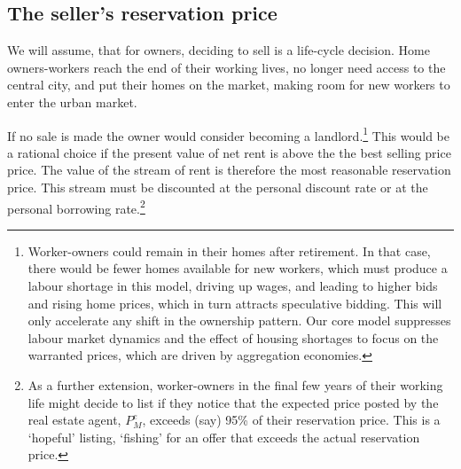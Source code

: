 


\subsection{The seller's reservation price} \label{section-reservation-price}

We will assume,  that for owners, deciding to sell is a life-cycle decision. Home owners-workers  reach the end of their working lives, no longer need access to the central city, and put their homes on the market, making room for new workers to enter the urban market.%


If no sale is made the owner would consider becoming a landlord.\footnote{Worker-owners could remain in their homes after retirement. In that case,  there would be fewer homes available for new workers, which must produce a labour shortage in this model, driving up wages, and leading to higher bids and rising home prices, which in turn attracts  speculative bidding. This will only accelerate any shift in the ownership pattern. Our core model suppresses labour market dynamics and the effect of housing shortages to focus on the warranted prices, which are driven by aggregation economies.}  This would be a rational choice if the present value of net rent is above the the best selling price price. 
The value of the stream of rent is therefore the most reasonable reservation price. This stream must be discounted at the personal discount rate or at the personal borrowing rate.\footnote{As a further extension, worker-owners in the final few years of their working life might decide to list if they notice that the expected price posted by the real estate agent, $P_M^e$,  exceeds (say) 95\% of their reservation price. This is a `hopeful' listing, `fishing' for an offer that exceeds the actual reservation price.}


%


